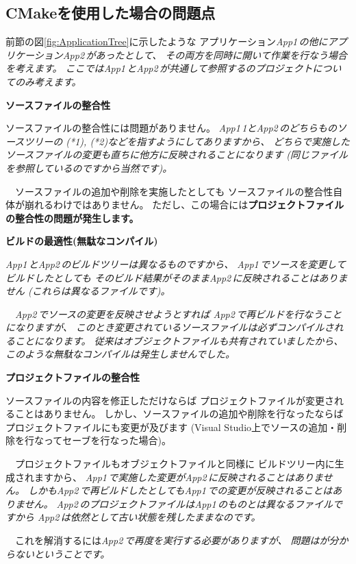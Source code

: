 \subsection{CMakeを使用した場合の問題点}
\label{subsec:Problems}

\def\App#1{\it{App#1\,}}
\def\App#1{\it{App#1\,}}

\noindent
前節の図\ref{fig:ApplicationTree}に示したような
アプリケーション\App{1}の他にアプリケーション\App{2}があったとして、
その両方を同時に開いて作業を行なう場合を考えます。
ここでは\App{1}と\App{2}が共通して参照する\SprLib のプロジェクトについてのみ考えます。

\bigskip
\noindent
\bf{ソースファイルの整合性}
\begin{narrow}[20pt]
	ソースファイルの整合性には問題がありません。
	\App1{1}と\App{2}のどちらも\SprLib のソースツリーの
	{\footnotesize{(*1)}}, {\footnotesize{(*2)}}などを指すようにしてありますから、
	どちらで実施したソースファイルの変更も直ちに他方に反映されることになります
	(同じファイルを参照しているのですから当然です)。

	　ソースファイルの追加や削除を実施したとしても
	ソースファイルの整合性自体が崩れるわけではありません。
	ただし、この場合には\bf{プロジェクトファイルの整合性}の問題が発生します。
\end{narrow}

\medskip
\noindent
\bf{ビルドの最適性(無駄なコンパイル)}
\begin{narrow}[20pt]
	\App{1}と\App{2}のビルドツリーは異なるものですから、
	\App{1}でソースを変更してビルドしたとしても
	そのビルド結果がそのまま\App{2}に反映されることはありません
	(これらは異なるファイルです)。

	　\App{2}でソースの変更を反映させようとすれば
	\App{2}で再ビルドを行なうことになりますが、
	このとき変更されているソースファイルは必ずコンパイルされることになります。
	従来はオブジェクトファイルも共有されていましたから、
	このような無駄なコンパイルは発生しませんでした。
\end{narrow}

\medskip
\noindent
\bf{プロジェクトファイルの整合性}
\begin{narrow}[20pt]
	ソースファイルの内容を修正しただけならば
	プロジェクトファイルが変更されることはありません。
	しかし、ソースファイルの追加や削除を行なったならば
	プロジェクトファイルにも変更が及びます
	(Visual Studio上でソースの追加・削除を行なってセーブを行なった場合)。

	　プロジェクトファイルもオブジェクトファイルと同様に
	ビルドツリー内に生成されますから、
	\App{1}で実施した変更が\App{2}に反映されることはありません。
	しかも\App{2}で再ビルドしたとしても\App{1}での変更が反映されることはありません。
	\App{2}のプロジェクトファイルは\App{1}のものとは異なるファイルですから
	\App{2}は依然として古い状態を残したままなのです。

	\indent
	　これを解消するには\App{2}で再度\cmake を実行する必要がありますが、
	問題はが分からないということです。
\end{narrow}

